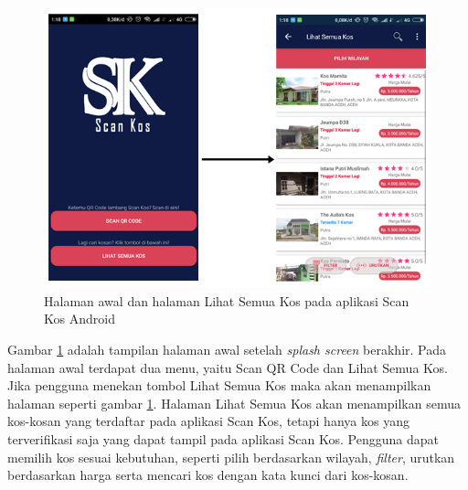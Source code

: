 		\begin{figure}[H]
			\centering
			\includegraphics[width=\textwidth]{gambar/and/and1}
			\caption{Halaman awal dan halaman Lihat Semua Kos pada aplikasi Scan Kos Android}
			\label{and2}
		\end{figure}
	
		Gambar \ref{and2} adalah tampilan halaman awal setelah \textit{splash screen }berakhir. Pada halaman awal terdapat dua menu, yaitu Scan QR Code dan Lihat Semua Kos. Jika pengguna menekan tombol Lihat Semua Kos maka akan menampilkan halaman seperti gambar \ref{and2}. Halaman Lihat Semua Kos akan menampilkan semua kos-kosan yang terdaftar pada aplikasi Scan Kos, tetapi hanya kos yang terverifikasi saja yang dapat tampil pada aplikasi Scan Kos. Pengguna dapat memilih kos sesuai kebutuhan, seperti pilih berdasarkan wilayah, \textit{filter}, urutkan berdasarkan harga serta mencari kos dengan kata kunci dari kos-kosan.
		

